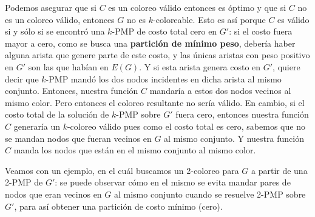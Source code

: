 \documentclass[11pt, a4paper, twoside]{article}
\begin{document}
\begin{enumerate}
				  Podemos asegurar que si $C$ es un coloreo válido entonces es óptimo y que si $C$ no es un coloreo válido,
				  entonces $G$ no es $k$-coloreable. Esto es así porque $C$ es válido si y sólo si se encontró una $k$-PMP de costo
				  total cero en $G'$: si el costo fuera mayor a cero, como se busca una \textbf{partición de mínimo peso}, debería haber 
				  alguna arista que genere parte de este costo, y 
				  las únicas aristas con peso positivo en $G'$ son las que habían en $E(G)$. Y si esta arista genera costo en $G'$, 
				  quiere decir que $k$-PMP mandó los dos nodos incidentes en dicha arista al mismo conjunto. Entonces, nuestra función
				  $C$ mandaría a estos dos nodos vecinos al mismo color. Pero entonces el coloreo resultante no sería válido. En cambio,
				  si el costo total de la solución de $k$-PMP sobre $G'$ fuera cero, entonces nuestra función $C$ generaría un $k$-coloreo
				  válido pues como el costo total es cero, sabemos que no se mandan nodos que fueran vecinos en $G$ al mismo conjunto.
				  Y nuestra función $C$ manda los nodos que están en el mismo conjunto al mismo color.
				  
				  Veamos con un ejemplo, en el cuál buscamos un 2-coloreo para $G$ a partir de una 2-PMP de $G'$:
				  se puede observar cómo en el mismo se evita mandar pares de nodos que eran vecinos en $G$ al mismo conjunto cuando 
				  se resuelve 2-PMP sobre $G'$, para así obtener una partición de costo mínimo (cero).
				  

\end{enumerate}
\end{document}
